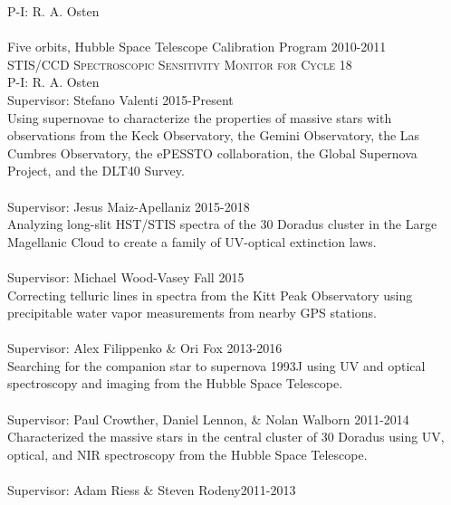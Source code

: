 \documentclass[10pt]{cv}
\begin{document}
\begin{llist}
P-I: R. A. Osten \\%
\\
Five orbits, Hubble Space Telescope Calibration Program \hfill 2010-2011\\ %
\textsc{STIS/CCD Spectroscopic Sensitivity Monitor for Cycle 18} \\
P-I: R. A. Osten\\%
%
\vspace{-0.1in}   
Supervisor: Stefano Valenti \hfill 2015-Present\\
Using supernovae to characterize the properties of massive stars with 
observations from the Keck Observatory, the Gemini Observatory, the 
Las Cumbres Observatory, the ePESSTO collaboration, the Global 
Supernova Project, and the DLT40 Survey.\\
\\
Supervisor: Jesus Maiz-Apellaniz \hfill 2015-2018\\
Analyzing long-slit HST/STIS spectra of the 30 Doradus cluster in 
the Large Magellanic Cloud to create a family of UV-optical extinction laws. \\
\\
Supervisor: Michael Wood-Vasey \hfill Fall 2015\\
Correcting telluric lines in spectra from the Kitt Peak Observatory using
precipitable water vapor measurements from nearby GPS stations.\\
\\
Supervisor: Alex Filippenko \& Ori Fox \hfill 2013-2016\\
Searching for the companion star to supernova 1993J using UV and optical 
spectroscopy and imaging from the Hubble Space Telescope.\\
\\
Supervisor: Paul Crowther, Daniel Lennon, \& Nolan Walborn \hfill 2011-2014\\
Characterized the massive stars in the central cluster of 30 Doradus using 
UV, optical, and NIR spectroscopy from the Hubble Space Telescope.\\
\\
Supervisor: Adam Riess \& Steven Rodeny\hfill 2011-2013\\

\end{llist}
\end{document}
